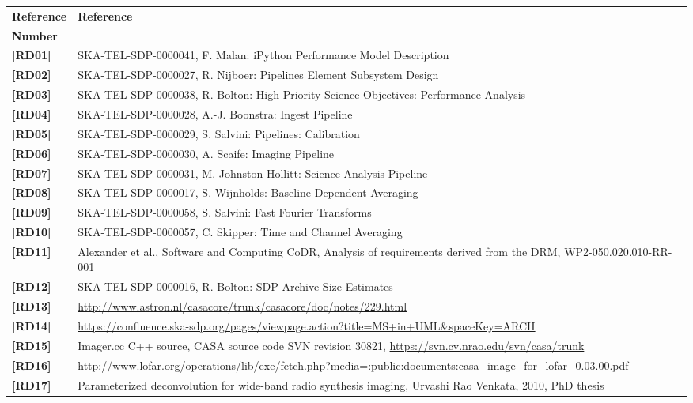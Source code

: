 \documentclass[11pt,a4paper]{article}
\begin{document}
 \begin{center}{
 \begin{tabularx}{\textwidth}{|l|X|}
     \hline
     \bf{Reference} & \bf{Reference}\\
     \bf{Number} & \\
     \hline
     {\bf [RD01]} & SKA-TEL-SDP-0000041, F. Malan: iPython Performance Model Description\\
    {\bf [RD02]} & SKA-TEL-SDP-0000027, R. Nijboer: Pipelines Element Subsystem Design\\
    {\bf [RD03]} & SKA-TEL-SDP-0000038, R. Bolton: High Priority Science Objectives: Performance Analysis\\
    {\bf [RD04]} & SKA-TEL-SDP-0000028, A.-J. Boonstra: Ingest Pipeline\\
    {\bf [RD05]} & SKA-TEL-SDP-0000029, S. Salvini: Pipelines: Calibration\\
    {\bf [RD06]} & SKA-TEL-SDP-0000030, A. Scaife: Imaging Pipeline\\
    {\bf [RD07]} & SKA-TEL-SDP-0000031, M. Johnston-Hollitt: Science Analysis Pipeline\\
    {\bf [RD08]} & SKA-TEL-SDP-0000017, S. Wijnholds: Baseline-Dependent
    Averaging\\
    {\bf [RD09]} & SKA-TEL-SDP-0000058, S. Salvini: Fast Fourier Transforms\\
    {\bf [RD10]} & SKA-TEL-SDP-0000057, C. Skipper: Time and Channel Averaging\\
    {\bf [RD11]} & Alexander et al., Software and Computing CoDR, Analysis of requirements derived from the DRM, WP2-050.020.010-RR-001\\
    {\bf [RD12]} & SKA-TEL-SDP-0000016, R. Bolton: SDP Archive Size
    Estimates\\
    {\bf [RD13]} & \url{http://www.astron.nl/casacore/trunk/casacore/doc/notes/229.html}\\
    {\bf [RD14]} & \url{https://confluence.ska-sdp.org/pages/viewpage.action?title=MS+in+UML&spaceKey=ARCH}\\
    {\bf [RD15]} & Imager.cc C++ source, CASA source code SVN revision 30821,
    \url{https://svn.cv.nrao.edu/svn/casa/trunk}\\ 
    {\bf [RD16]} & \url{http://www.lofar.org/operations/lib/exe/fetch.php?media=:public:documents:casa_image_for_lofar_0.03.00.pdf}\\
    {\bf [RD17]} & Parameterized deconvolution for wide-band radio synthesis
    imaging, Urvashi Rao Venkata, 2010, PhD thesis\\

\end{tabularx}}
\end{center}
\end{document}
